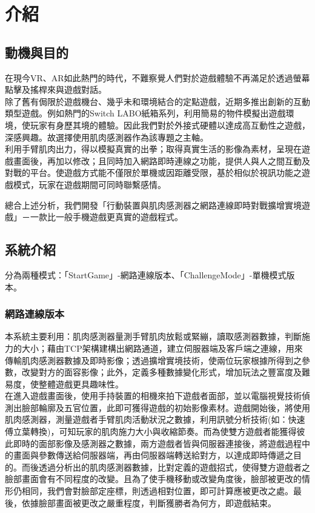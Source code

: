 \documentclass[12pt]{article}  %
\theoremstyle{plain}
\begin{document}
\tableofcontents  %
\newpage

\section{介紹}

\subsection{動機與目的}
在現今VR、AR如此熱門的時代，不難察覺人們對於遊戲體驗不再滿足於透過螢幕點擊及搖桿來與遊戲對話。\\
\indent 除了舊有侷限於遊戲機台、幾乎未和環境結合的定點遊戲，近期多推出創新的互動類型遊戲。例如熱門的Switch LABO紙箱系列，利用簡易的物件模擬出遊戲環境，使玩家有身歷其境的體驗。因此我們對於外接式硬體以達成高互動性之遊戲，深感興趣。故選擇使用肌肉感測器作為該專題之主軸。\\
\indent 利用手臂肌肉出力，得以模擬真實的出拳；取得真實生活的影像為素材，呈現在遊戲畫面後，再加以修改；且同時加入網路即時連線之功能，提供人與人之間互動及對戰的平台。使遊戲方式能不僅限於單機或因距離受限，基於相似於視訊功能之遊戲模式，玩家在遊戲期間可同時聯繫感情。

 
\indent 總合上述分析，我們開發「行動裝置與肌肉感測器之網路連線即時對戰擴增實境遊戲」－一款比一般手機遊戲更真實的遊戲程式。

\subsection{系統介紹}
分為兩種模式：「StartGame」-網路連線版本、「ChallengeMode」-單機模式版本。

\subsubsection{網路連線版本}
本系統主要利用：肌肉感測器量測手臂肌肉放鬆或緊繃，讀取感測器數據，判斷施力的大小；藉由TCP架構建構出網路通道，建立伺服器端及客戶端之連線，用來傳輸肌肉感測器數據及即時影像；透過擴增實境技術，使兩位玩家根據所得到之參數，改變對方的面容影像；此外，定義多種數據變化形式，增加玩法之豐富度及難易度，使整體遊戲更具趣味性。\\
\indent 在進入遊戲畫面後，使用手持裝置的相機來拍下遊戲者面部，並以電腦視覺技術偵測出臉部輪廓及五官位置，此即可獲得遊戲的初始影像素材。遊戲開始後，將使用肌肉感測器，測量遊戲者手臂肌肉活動狀況之數據，利用訊號分析技術(如：快速傅立葉轉換)，可知玩家的肌肉施力大小與收縮節奏。而為使雙方遊戲者能獲得彼此即時的面部影像及感測器之數據，兩方遊戲者皆與伺服器連接後，將遊戲過程中的畫面與參數傳送給伺服器端，再由伺服器端轉送給對方，以達成即時傳遞之目的。而後透過分析出的肌肉感測器數據，比對定義的遊戲招式，使得雙方遊戲者之臉部畫面會有不同程度的改變。且為了使手機移動或改變角度後，臉部被更改的情形仍相同，我們會對臉部定座標，則透過相對位置，即可計算應被更改之處。最後，依據臉部畫面被更改之嚴重程度，判斷獲勝者為何方，即遊戲結束。
\end{document}
